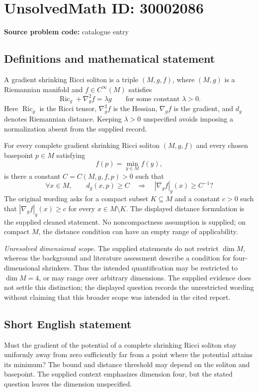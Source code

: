 \documentclass[11pt]{article}
\begin{document}
\section*{UnsolvedMath ID: 30002086}
\textbf{Source problem code:} catalogue entry
\subsection{Definitions and mathematical statement}
A gradient shrinking Ricci soliton is a triple \((M,g,f)\), where \((M,g)\) is a Riemannian manifold and \(f\in C^\infty(M)\) satisfies
\[
\operatorname{Ric}_g+\nabla_g^2 f=\lambda g
\qquad\text{for some constant }\lambda>0.
\]
Here \(\operatorname{Ric}_g\) is the Ricci tensor, \(\nabla_g^2f\) is the Hessian, \(\nabla_g f\) is the gradient, and \(d_g\) denotes Riemannian distance. Keeping \(\lambda>0\) unspecified avoids imposing a normalization absent from the supplied record.

For every complete gradient shrinking Ricci soliton \((M,g,f)\) and every chosen basepoint \(p\in M\) satisfying
\[
f(p)=\min_{y\in M}f(y),
\]
is there a constant \(C=C(M,g,f,p)>0\) such that
\[
\forall x\in M,\qquad
 d_g(x,p)\geq C
 \quad\Longrightarrow\quad
 |\nabla_g f|_g(x)\geq C^{-1}?
\]
The original wording asks for a compact subset \(K\subseteq M\) and a constant \(c>0\) such that \(|\nabla_g f|_g(x)\geq c\) for every \(x\in M\setminus K\). The displayed distance formulation is the supplied cleaned statement. No noncompactness assumption is supplied; on compact \(M\), the distance condition can have an empty range of applicability.

\emph{Unresolved dimensional scope.} The supplied statements do not restrict \(\dim M\), whereas the background and literature assessment describe a condition for four-dimensional shrinkers. Thus the intended quantification may be restricted to \(\dim M=4\), or may range over arbitrary dimensions. The supplied evidence does not settle this distinction; the displayed question records the unrestricted wording without claiming that this broader scope was intended in the cited report.
\subsection{Short English statement}
Must the gradient of the potential of a complete shrinking Ricci soliton stay uniformly away from zero sufficiently far from a point where the potential attains its minimum? The bound and distance threshold may depend on the soliton and basepoint. The supplied context emphasizes dimension four, but the stated question leaves the dimension unspecified.
\end{document}
